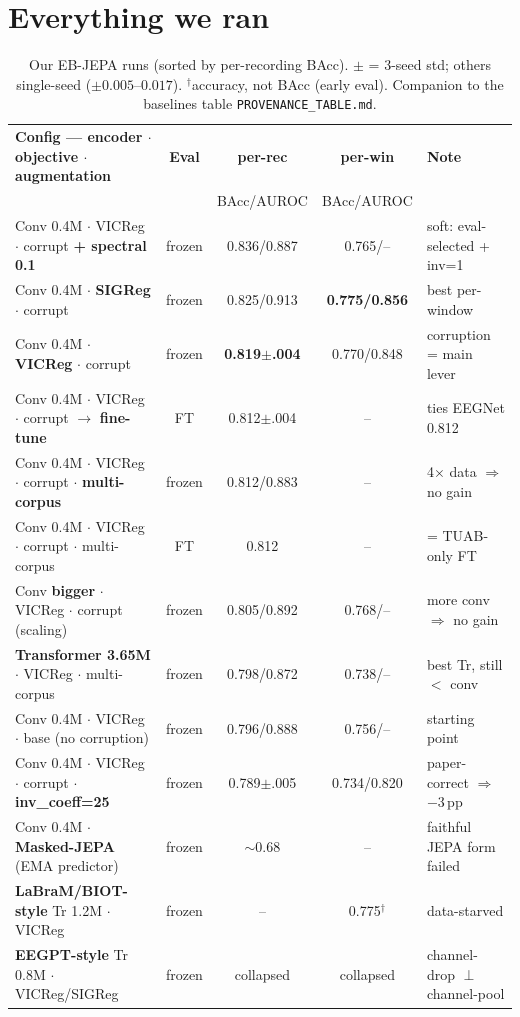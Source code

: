 \documentclass[11pt,a4paper]{article}
\newcommand{\good}[1]{\textcolor{good}{#1}}\newcommand{\bad}[1]{\textcolor{bad}{#1}}
\begin{document}
\section{Everything we ran}
\begin{table}[H]\centering\footnotesize
\renewcommand{\arraystretch}{1.15}
\begin{tabular}{@{}p{6.5cm}cccp{3.1cm}@{}}
\toprule
\textbf{Config — encoder $\cdot$ objective $\cdot$ augmentation} & \textbf{Eval} &
\textbf{per-rec} & \textbf{per-win} & \textbf{Note} \\
& & \scriptsize BAcc/AUROC & \scriptsize BAcc/AUROC & \\
\midrule
Conv 0.4M $\cdot$ VICReg $\cdot$ corrupt \textbf{+ spectral 0.1} & frozen & 0.836/0.887 & 0.765/-- & \bad{soft}: eval-selected + inv=1 \\
Conv 0.4M $\cdot$ \textbf{SIGReg} $\cdot$ corrupt & frozen & 0.825/0.913 & \textbf{0.775/0.856} & best per-window \\
Conv 0.4M $\cdot$ \textbf{VICReg} $\cdot$ corrupt & frozen & \textbf{0.819$\pm$.004} & 0.770/0.848 & \good{corruption = main lever} \\
Conv 0.4M $\cdot$ VICReg $\cdot$ corrupt $\to$ \textbf{fine-tune} & FT & 0.812$\pm$.004 & -- & \good{ties EEGNet 0.812} \\
Conv 0.4M $\cdot$ VICReg $\cdot$ corrupt $\cdot$ \textbf{multi-corpus} & frozen & 0.812/0.883 & -- & 4$\times$ data $\Rightarrow$ no gain \\
Conv 0.4M $\cdot$ VICReg $\cdot$ corrupt $\cdot$ multi-corpus & FT & 0.812 & -- & = TUAB-only FT \\
Conv \textbf{bigger} $\cdot$ VICReg $\cdot$ corrupt (scaling) & frozen & 0.805/0.892 & 0.768/-- & more conv $\Rightarrow$ no gain \\
\textbf{Transformer 3.65M} $\cdot$ VICReg $\cdot$ multi-corpus & frozen & 0.798/0.872 & 0.738/-- & best Tr, still $<$ conv \\
Conv 0.4M $\cdot$ VICReg $\cdot$ base (no corruption) & frozen & 0.796/0.888 & 0.756/-- & starting point \\
Conv 0.4M $\cdot$ VICReg $\cdot$ corrupt $\cdot$ \textbf{inv\_coeff=25} & frozen & 0.789$\pm$.005 & 0.734/0.820 & \bad{paper-correct $\Rightarrow$ $-$3\,pp} \\
Conv 0.4M $\cdot$ \textbf{Masked-JEPA} (EMA predictor) & frozen & $\sim$0.68 & -- & \bad{faithful JEPA form failed} \\
\textbf{LaBraM/BIOT-style} Tr 1.2M $\cdot$ VICReg & frozen & -- & 0.775$^\dagger$ & data-starved \\
\textbf{EEGPT-style} Tr 0.8M $\cdot$ VICReg/SIGReg & frozen & \bad{collapsed} & \bad{collapsed} & channel-drop $\perp$ channel-pool \\
\bottomrule
\end{tabular}
\caption{Our EB-JEPA runs (sorted by per-recording BAcc). $\pm$ = 3-seed std; others single-seed
($\pm0.005$--$0.017$). $^\dagger$accuracy, not BAcc (early eval). Companion to the baselines table
\texttt{PROVENANCE\_TABLE.md}.}
\end{table}
\end{document}
